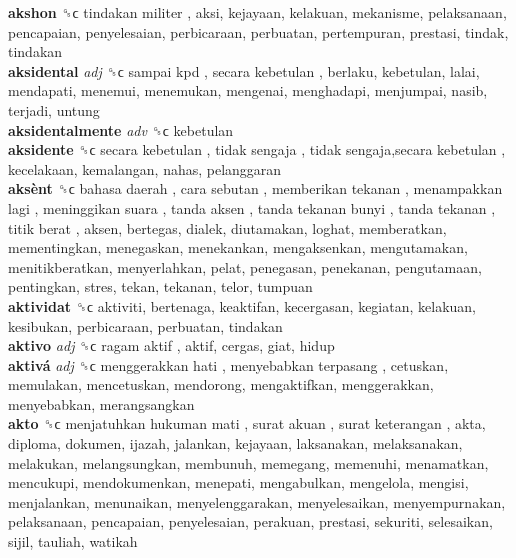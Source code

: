 \textbf{akshon} ␝ϲ   tindakan militer , aksi, kejayaan, kelakuan, mekanisme, pelaksanaan, pencapaian, penyelesaian, perbicaraan, perbuatan, pertempuran, prestasi, tindak, tindakan  \\
\textbf{aksidental} \emph{adj}  ␝ϲ   sampai kpd ,  secara kebetulan , berlaku, kebetulan, lalai, mendapati, menemui, menemukan, mengenai, menghadapi, menjumpai, nasib, terjadi, untung  \\
\textbf{aksidentalmente} \emph{adv}  ␝ϲ  kebetulan  \\
\textbf{aksidente} ␝ϲ   secara kebetulan ,  tidak sengaja ,  tidak sengaja,secara kebetulan , kecelakaan, kemalangan, nahas, pelanggaran  \\
\textbf{aksènt} ␝ϲ   bahasa daerah ,  cara sebutan ,  memberikan tekanan ,  menampakkan lagi ,  meninggikan suara ,  tanda aksen ,  tanda tekanan bunyi ,  tanda tekanan ,  titik berat , aksen, bertegas, dialek, diutamakan, loghat, memberatkan, mementingkan, menegaskan, menekankan, mengaksenkan, mengutamakan, menitikberatkan, menyerlahkan, pelat, penegasan, penekanan, pengutamaan, pentingkan, stres, tekan, tekanan, telor, tumpuan  \\
\textbf{aktividat} ␝ϲ  aktiviti, bertenaga, keaktifan, kecergasan, kegiatan, kelakuan, kesibukan, perbicaraan, perbuatan, tindakan  \\
\textbf{aktivo} \emph{adj}  ␝ϲ   ragam aktif , aktif, cergas, giat, hidup  \\
\textbf{aktivá} \emph{adj}  ␝ϲ   menggerakkan hati ,  menyebabkan terpasang , cetuskan, memulakan, mencetuskan, mendorong, mengaktifkan, menggerakkan, menyebabkan, merangsangkan  \\
\textbf{akto} ␝ϲ   menjatuhkan hukuman mati ,  surat akuan ,  surat keterangan , akta, diploma, dokumen, ijazah, jalankan, kejayaan, laksanakan, melaksanakan, melakukan, melangsungkan, membunuh, memegang, memenuhi, menamatkan, mencukupi, mendokumenkan, menepati, mengabulkan, mengelola, mengisi, menjalankan, menunaikan, menyelenggarakan, menyelesaikan, menyempurnakan, pelaksanaan, pencapaian, penyelesaian, perakuan, prestasi, sekuriti, selesaikan, sijil, tauliah, watikah  \\
